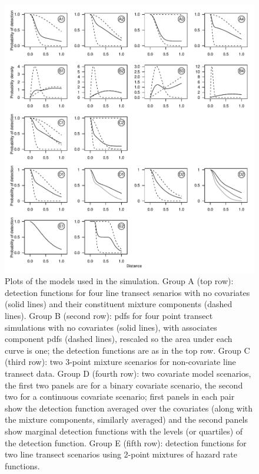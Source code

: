 \documentclass[useAMS,referee,usenatbib]{biom}
\begin{document}
\begin{figure}
\centering
\includegraphics[width=\textwidth]{figs/sim-detfct.pdf}
\caption{Plots of the models used in the simulation. Group A (top row): detection functions for four line transect senarios with no covariates (solid lines) and their constituent mixture components (dashed lines). Group B (second row): pdfs for four point transect simulations with no covariates (solid lines), with associates component pdfs (dashed lines), rescaled so the area under each curve is one; the detection functions are as in the top row. Group C (third row): two 3-point mixture scenarios for non-covariate line transect data. Group D (fourth row): two covariate model scenarios, the first two panels are for a binary covariate scenario, the second two for a continuous covariate scenario; first panels in each pair show the detection function averaged over the covariates (along with the mixture components, similarly averaged) and the second panels show marginal detection functions with the levels (or quartiles) of the detection function.  Group E (fifth row): detection functions for two line transect scenarios using 2-point mixtures of hazard rate functions.}
\label{sim-detfcts}
\end{figure}
\end{document}
